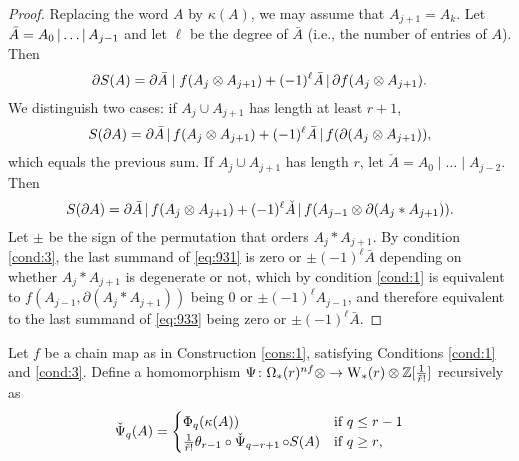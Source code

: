\begin{proof}
	Replacing the word $A$ by $\kappa(A)$, we may assume that $A_{j+1} = A_k$. Let $\bar{A} = A_0\operatorname{|} \dots\operatorname{|} A_{j-1}$ and let $\ell$ be the degree of $\bar{A}$ (i.e., the number of entries of $A$). Then %
	\begin{equation}\label{eq:931}
		\partial S(A) = \partial \bar{A}\mid f(A_{j} \otimes A_{j+1}) + (-1)^{\ell}\bar{A}\operatorname{|} \partial f(A_{j} \otimes A_{j+1}).
	\end{equation}
	We distinguish two cases: if $A_j\cup A_{j+1}$ has length at least $r+1$,
	\[S(\partial A) = \partial \bar{A}\operatorname{|} f(A_j \otimes A_{j+1}) + (-1)^{\ell}\bar{A}\operatorname{|} f(\partial (A_j \otimes A_{j+1})),\]
	which equals the previous sum. If $A_j\cup A_{j+1}$ has length $r$, let $\check{A} = A_0\mid \dots\mid A_{j-2}$. Then
	\begin{equation}\label{eq:933}
		S(\partial A) = \partial \bar{A}\operatorname{|} f(A_j \otimes A_{j+1}) + (-1)^\ell \check{A}\operatorname{|} f(A_{j-1} \otimes \partial(A_j*A_{j+1})).
	\end{equation}
	Let $\pm$ be the sign of the permutation that orders $A_j*A_{j+1}$. By condition \eqref{cond:3}, the last summand of \eqref{eq:931} is zero or $\pm(-1)^\ell\bar{A}$ depending on whether $A_j*A_{j+1}$ is degenerate or not, which by condition \eqref{cond:1} is equivalent to $f(A_{j-1},\partial(A_j*A_{j+1}))$ being $0$ or $\pm(-1)^{\ell}A_{j-1}$, and therefore equivalent to the last summand of \eqref{eq:933} being zero or $\pm(-1)^{\ell}\bar{A}$.
\end{proof}


\begin{definition}\label{def:psiom}
	Let $f$ be a chain map as in Construction \ref{cons:1}, satisfying Conditions \eqref{cond:1} and \eqref{cond:3}. Define a homomorphism $\Psi \colon \Omega_*(r)^{nf} \otimes \to \operatorname{W}_{*}(r) \otimes \mathbb{Z}[\frac{1}{\tilde{r}!}]$ recursively as
	\[\operatorname{\check{\Psi}}_q(A) = \begin{cases} \Phi_q(\kappa(A)) & \text{if $q\leq r-1$} \\
		\frac{1}{\tilde{r}!}\theta_{r-1}\circ \operatorname{\check{\Psi}}_{q-r+1}\circ S(A) & \text{if $q \geq r$,}\end{cases}\]
\end{definition}

